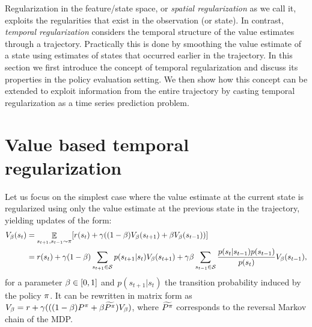 Regularization in the feature/state space, or \emph{spatial regularization} as we call it, exploits the regularities that exist in the observation (or state). In contrast, \emph{temporal regularization} considers the temporal structure of the value estimates through a trajectory. Practically this is done by smoothing the value estimate of a state using estimates of states that occurred earlier in the trajectory.
In this section we first introduce the concept of temporal regularization and discuss its properties in the policy evaluation setting. We then show how this concept can be extended to exploit information from the entire trajectory by casting temporal regularization as a time series prediction problem. 
\section{Value based temporal regularization}
Let us focus on the simplest case where the value estimate at the current state is regularized using only the value estimate at the previous state in the trajectory, yielding updates of the form: %
\begin{equation}
    \begin{split}
        V_{\beta}(s_{t}) &= \mathop{\mathbb{E}}_{s_{t+1},s_{t-1} \sim \pi} [r(s_t) + \gamma ((1-\beta)V_{\beta}(s_{t+1}) + \beta V_{\beta}(s_{t-1}))]\\
         &= r(s_t) + \gamma (1-\beta)\sum_{s_{t+1}\in \mathcal{S}} p(s_{t+1}|s_t)V_{\beta}(s_{t+1})
         + \gamma \beta \sum_{s_{t-1} \in \mathcal{S}}\frac{p(s_t|s_{t-1}) p(s_{t-1})}{p(s_t)} V_{\beta}(s_{t-1}),
    \end{split}
\end{equation}
for a parameter $\beta \in [0,1]$ and $p(s_{t+1}|s_t)$ the transition probability induced by the policy $\pi$. It can be rewritten in matrix form as $V_{\beta} = r + \gamma (((1-\beta) P^{\pi} + \beta \widetilde{P^{\pi}})V_{\beta}) $, where $\widetilde{P^{\pi}}$ corresponds to the reversal Markov chain of the MDP.
